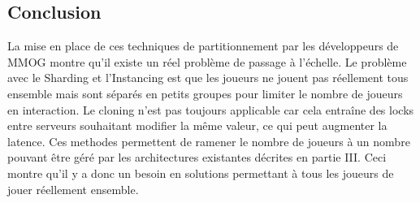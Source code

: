 \subsection{Conclusion}
La mise en place de ces techniques de partitionnement par les développeurs de MMOG montre qu'il existe un réel problème de passage à l'échelle.
Le problème avec le Sharding et l'Instancing est que les joueurs ne jouent pas réellement tous ensemble mais sont séparés en petits groupes pour limiter le nombre de joueurs en interaction.
Le cloning n'est pas toujours applicable car cela entraîne des locks entre serveurs souhaitant modifier la même valeur, ce qui peut augmenter la latence.
Ces methodes permettent de ramener le nombre de joueurs à un nombre pouvant être géré par les architectures existantes décrites en partie III.
Ceci montre qu'il y a donc un besoin en solutions permettant à tous les joueurs de jouer réellement ensemble.
